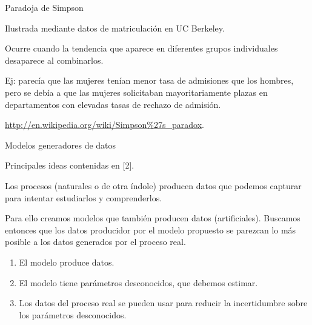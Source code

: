 
\begin{frame}{Paradoja de Simpson}
  \begin{wideitemize}
  \item Ilustrada mediante datos de matriculación en UC Berkeley.
  \item Ocurre cuando la tendencia que aparece en diferentes grupos individuales
  desaparece al combinarlos.
  
  \item Ej: parecía que las mujeres tenían menor tasa de admisiones que los hombres,
  pero se debía a que las mujeres solicitaban mayoritariamente plazas en departamentos
  con elevadas tasas de rechazo de admisión.
  
  \item \small{\url{http://en.wikipedia.org/wiki/Simpson\%27s_paradox}.}

 \end{wideitemize}

\end{frame}


\begin{frame}{Modelos generadores de datos}
  \begin{wideitemize}
  \item Principales ideas contenidas en [2].
  \item Los procesos (naturales o de otra índole) producen datos que podemos capturar
  para intentar estudiarlos y comprenderlos.
  \item Para ello creamos modelos que también producen datos (artificiales). Buscamos
  entonces que los datos producidor por el modelo propuesto se parezcan lo más posible
  a los datos generados por el proceso real.
  \begin{enumerate}
   \item El modelo produce datos.
   \item El modelo tiene parámetros desconocidos, que debemos estimar.
   \item Los datos del proceso real se pueden usar para reducir la incertidumbre
   sobre los parámetros desconocidos.
  \end{enumerate}

 \end{wideitemize}

\end{frame}


